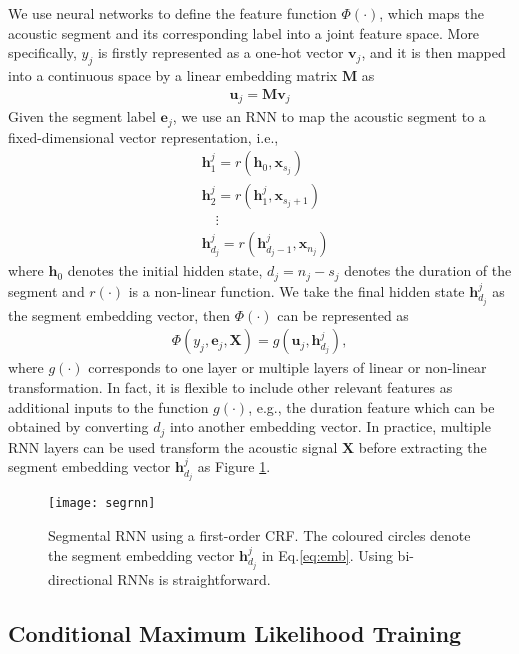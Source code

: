 \documentclass[a4paper]{article}
\begin{document}
We use neural networks to define the feature function $\Phi(\cdot)$, which maps the acoustic segment and its corresponding label into a joint feature space. More specifically, $y_j$ is firstly represented as a one-hot vector $\mathbf{v}_j$, and it is then mapped into a continuous space by a linear embedding matrix $\mathbf{M}$ as
\begin{align}
\mathbf{u}_j = \mathbf{Mv}_j
\end{align}
Given the segment label $\mathbf{e}_j$, we use an RNN to map the acoustic segment to a fixed-dimensional vector representation,  i.e.,
\begin{align}
&\mathbf{h}_{1}^j =   r(\mathbf{h}_0, \mathbf{x}_{s_j}) \\
&\mathbf{h}_{2}^j =  r(\mathbf{h}_1^j, \mathbf{x}_{s_j + 1}) \\
& \quad \vdots \nonumber \\ 
\label{eq:emb}
&\mathbf{h}_{d_j}^j   =  r(\mathbf{h}_{d_j -1}^j, \mathbf{x}_{n_{j}}) 
\end{align}
where $\mathbf{h}_0$ denotes the initial hidden state, $d_j = n_{j} - s_{j}$ denotes the duration of the segment and $r(\cdot)$ is a non-linear function. We take the final hidden state $\mathbf{h}_{d_j}^j$ as the segment embedding vector, then $\Phi(\cdot)$ can be represented as 
\begin{align}
\Phi(y_j, \mathbf{e}_j, \mathbf{X}) = g(\mathbf{u}_j, \mathbf{h}_{d_j}^j),
\end{align}
where $g(\cdot)$ corresponds to one layer or multiple layers of linear or non-linear transformation. In fact, it is flexible to include other relevant features as additional inputs to the function $g(\cdot)$, e.g., the duration feature which can be obtained by converting $d_j$ into another embedding vector. In practice, multiple RNN layers can be used transform the acoustic signal $\mathbf{X}$ before extracting the segment embedding vector $\mathbf{h}_{d_j}^j$ as Figure \ref{fig:segrnn}. 

\begin{figure}[t]
\small
\centerline{\texttt{[image: segrnn]}} \vskip -4mm
\caption{Segmental RNN using a first-order CRF. The coloured circles denote the segment embedding vector $\mathbf{h}_{d_j}^j$ in Eq.\eqref{eq:emb}. Using bi-directional RNNs is straightforward. }  
\label{fig:segrnn}
\vskip -5mm
\end{figure}

\subsection{Conditional Maximum Likelihood Training}
\end{document}
